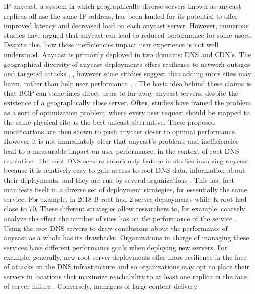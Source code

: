 \documentclass[sigconf,nonacm,10pt]{acmart}
\begin{document}
\label{sec:introduction} IP anycast, a system in which geographically
diverse servers known as anycast replicas all use the same IP address,
has been lauded for its potential to offer improved latency and
decreased load on each anycast server. However, numerous studies have
argued that anycast can lead to reduced performance for some users.
Despite this, how these inefficiencies impact user experience is not
well understood. \break \break
Anycast is primarily deployed in two domains: DNS and CDN's. The
geographical diversity of anycast deployments offers resilience to
network outages and targeted attacks
\cite{li_levin_spring_bhattacharjee_2018}, \cite{moura2016anycast},
however some studies suggest that adding more sites may harm, rather
than help user performance \cite{li_levin_spring_bhattacharjee_2018},
\cite{sarat2006use}. The basic idea behind these claims is that BGP can
sometimes direct users to far-away anycast servers, despite the
existence of a geographically close server. Often, studies have framed
the problem as a sort of optimization problem, where every user request
should be mapped to the same physical site as the best unicast
alternative. These proposed modifications are then shown to push anycast
closer to optimal performance. However it is not immediately clear that
anycast's problems and inefficiencies lead to a measurable impact on
user performance, in the context of root DNS resolution. \break \break
The root DNS servers notoriously feature in studies involving anycast
because it is relatively easy to gain access to root DNS data,
information about their deployments, and they are run by several
organizations \cite{root_servers}. This last fact manifests itself in a
diverse set of deployment strategies, for essentially the same service.
For example, in 2018 B-root had 2 server deployments while K-root had
close to 70. These different strategies allow researchers to, for
example, coarsely analyze the effect the number of sites has on the
performance of the service \cite{li_levin_spring_bhattacharjee_2018}.
\break \break
Using the root DNS servers to draw conclusions about the performance of
anycast as a whole has its drawbacks. Organizations in charge of
managing these services have different performance goals when deploying
new servers. For example, generally, new root server deployments offer
more resilience in the face of attacks on the DNS infrastructure and so
organizations may opt to place their servers in locations that maximize
reachability to at least one replica in the face of server failure
\cite{moura2016anycast}. Conversely, managers of large content delivery
\end{document}
